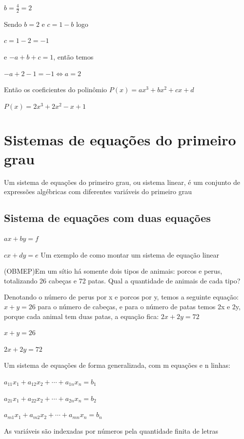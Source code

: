 \begin{multicols*}{2}
\begin{enumerate}[wide, labelwidth=!, labelindent=0pt]
\begin{enumerate}
                        $b = \frac{4}{2} = 2$

                        Sendo $b = 2$ e $c = 1 - b$ logo

                        $c = 1 - 2 = -1$

                        e $-a+b+c = 1$, então temos

                        $-a +2 - 1 = -1 \Leftrightarrow a = 2$

                        Então os coeficientes do polinômio $P(x) = ax^3 + bx^2 + cx + d$

                        $P(x) = 2x^3 +2x^2 -x +1$
              \end{enumerate}
    \end{enumerate}

    \section*{Sistemas de equações do primeiro grau}
    Um sistema de equações do primeiro grau, ou sistema linear, é um conjunto de expressões 				algébricas com diferentes variáveis do primeiro grau
    \subsection*{Sistema de equações com duas equações}
    $ax + by = f $

    $cx + dy = e$
    Um exemplo de como montar um sistema de equação linear

    (OBMEP)Em um sítio há somente dois tipos de animais: porcos e perus, totalizando 26 cabeças e 			72 patas. Qual a quantidade de animais de cada tipo?

    Denotando o número de perus por x e porcos por y, temos a seguinte equação: $x + y =26$ para 			o número de cabeças, e para o número de patas temos 2x e 2y, porque cada animal tem duas patas, 		a equação fica: $2x + 2y = 72$

    $x+y=26$

    $2x+2y = 72$

    Um sistema de equações de forma generalizada, com m equações e n linhas:

    $a_{11}x_1 + a_{12}x_2 + \cdots + a_{1n}x_n = b_1$

    $a_{21}x_1 + a_{22}x_2 + \cdots + a_{2n}x_n = b_2$

    $a_{m1}x_1 + a_{m2}x_2 + \cdots + a_{mn}x_n = b_n$

    As variáveis são indexadas por números pela quantidade finita de letras


\end{multicols*}
